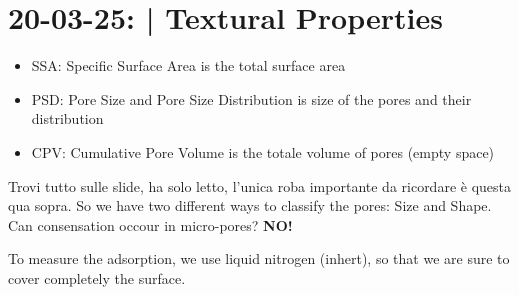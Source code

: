 \section{20-03-25: | Textural Properties}

\begin{itemize}
    \item SSA: Specific Surface Area is the total surface area
    \item PSD: Pore Size and Pore Size Distribution is size of the pores and their distribution
    \item CPV: Cumulative Pore Volume is the totale volume of pores (empty space)
\end{itemize}
Trovi tutto sulle slide, ha solo letto, l'unica roba importante da ricordare è questa qua sopra. So we have two different ways to classify the pores: Size and Shape.
Can consensation occour in micro-pores? \textbf{NO!}

To measure the adsorption, we use liquid nitrogen (inhert), so that we are sure to cover completely the surface.
